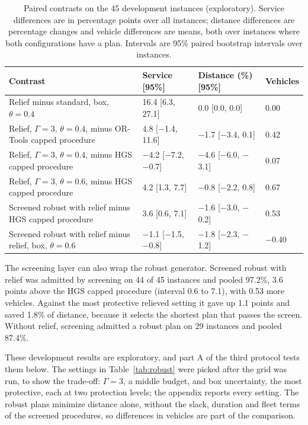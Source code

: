 \begin{table}[htbp]
\centering
\footnotesize
\caption{Paired contrasts on the 45 development instances (exploratory). Service differences are in percentage points over all instances; distance differences are percentage changes and vehicle differences are means, both over instances where both configurations have a plan. Intervals are 95\% paired bootstrap intervals over instances.}
\label{tab:robust-contrasts}
\begin{tabular}{@{}>{\raggedright\arraybackslash}p{5.6cm}lll@{}}
\toprule
Contrast & Service [95\%] & Distance (\%) [95\%] & Vehicles\\
\midrule
Relief minus standard, box, $\theta=0.4$ & 16.4 [6.3, 27.1] & 0.0 [0.0, 0.0] & 0.00\\
Relief, $\Gamma=3$, $\theta=0.4$, minus OR-Tools capped procedure & 4.8 [$-$1.4, 11.6] & $-$1.7 [$-$3.4, 0.1] & 0.42\\
Relief, $\Gamma=3$, $\theta=0.4$, minus HGS capped procedure & $-$4.2 [$-$7.2, $-$0.7] & $-$4.6 [$-$6.0, $-$3.1] & 0.07\\
Relief, $\Gamma=3$, $\theta=0.6$, minus HGS capped procedure & 4.2 [1.3, 7.7] & $-$0.8 [$-$2.2, 0.8] & 0.67\\
Screened robust with relief minus HGS capped procedure & 3.6 [0.6, 7.1] & $-$1.6 [$-$3.0, $-$0.2] & 0.53\\
Screened robust with relief minus relief, box, $\theta=0.6$ & $-$1.1 [$-$1.5, $-$0.8] & $-$1.8 [$-$2.3, $-$1.2] & $-$0.40\\
\bottomrule
\end{tabular}
\end{table}

The screening layer can also wrap the robust generator. Screened robust with relief was admitted by screening on 44 of 45 instances and pooled 97.2\%, 3.6 points above the HGS capped procedure (interval 0.6 to 7.1), with 0.53 more vehicles. Against the most protective relieved setting it gave up 1.1 points and saved 1.8\% of distance, because it selects the shortest plan that passes the screen. Without relief, screening admitted a robust plan on 29 instances and pooled 87.4\%.

These development results are exploratory, and part A of the third protocol tests them below. The settings in Table~\ref{tab:robust} were picked after the grid was run, to show the trade-off: $\Gamma=3$, a middle budget, and box uncertainty, the most protective, each at two protection levels; the appendix reports every setting. The robust plans minimize distance alone, without the slack, duration and fleet terms of the screened procedures, so differences in vehicles are part of the comparison.

